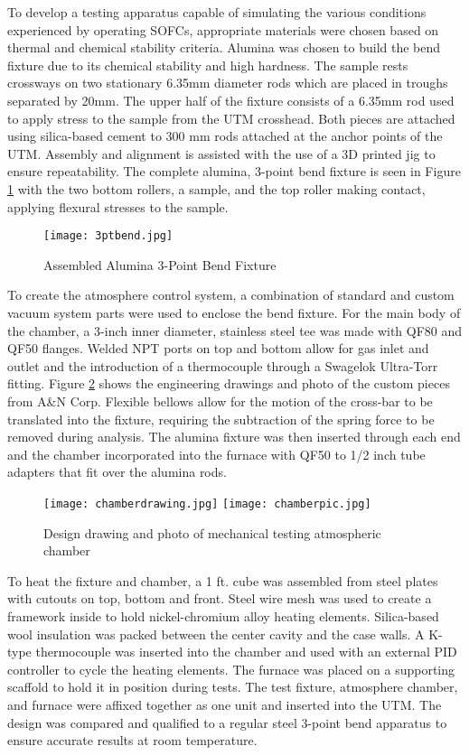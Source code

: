 To develop a testing apparatus capable of simulating the various conditions experienced by operating SOFCs, appropriate materials were chosen based on thermal and chemical stability criteria.
Alumina was chosen to build the bend fixture due to its chemical stability and high hardness.
The sample rests crossways on two stationary 6.35mm diameter rods which are placed in troughs separated by 20mm.
The upper half of the fixture consists of a 6.35mm rod used to apply stress to the sample from the UTM crosshead.
Both pieces are attached using silica-based cement to 300 mm rods attached at the anchor points of the UTM.
Assembly and alignment is assisted with the use of a 3D printed jig to ensure repeatability.
The complete alumina, 3-point bend fixture is seen in Figure \ref{fig:3ptbend} with the two bottom rollers, a sample, and the top roller making contact, applying flexural stresses to the sample.

\begin{figure}
    \texttt{[image: 3ptbend.jpg]}
    \caption{Assembled Alumina 3-Point Bend Fixture}
    \label{fig:3ptbend}
\end{figure}

To create the atmosphere control system, a combination of standard and custom vacuum system parts were used to enclose the bend fixture.
For the main body of the chamber, a 3-inch inner diameter, stainless steel tee was made with QF80 and QF50 flanges.
Welded NPT ports on top and bottom allow for gas inlet and outlet and the introduction of a thermocouple through a Swagelok Ultra-Torr fitting.
Figure \ref{fig:chamber} shows the engineering drawings and photo of the custom pieces from A\&N Corp.
Flexible bellows allow for the motion of the cross-bar to be translated into the fixture, requiring the subtraction of the spring force to be removed during analysis.
The alumina fixture was then inserted through each end and the chamber incorporated into the furnace with QF50 to 1/2 inch tube adapters that fit over the alumina rods.

\begin{figure}
    \texttt{[image: chamberdrawing.jpg]}
    \texttt{[image: chamberpic.jpg]}
    \caption{Design drawing and photo of mechanical testing atmospheric chamber}
    \label{fig:chamber}
\end{figure}

To heat the fixture and chamber, a 1 ft. cube was assembled from steel plates with cutouts on top, bottom and front.
Steel wire mesh was used to create a framework inside to hold nickel-chromium alloy heating elements.
Silica-based wool insulation was packed between the center cavity and the case walls.
A K-type thermocouple was inserted into the chamber and used with an external PID controller to cycle the heating elements.
The furnace was placed on a supporting scaffold to hold it in position during tests.
The test fixture, atmosphere chamber, and furnace were affixed together as one unit and inserted into the UTM.
The design was compared and qualified to a regular steel 3-point bend apparatus to ensure accurate results at room temperature.

